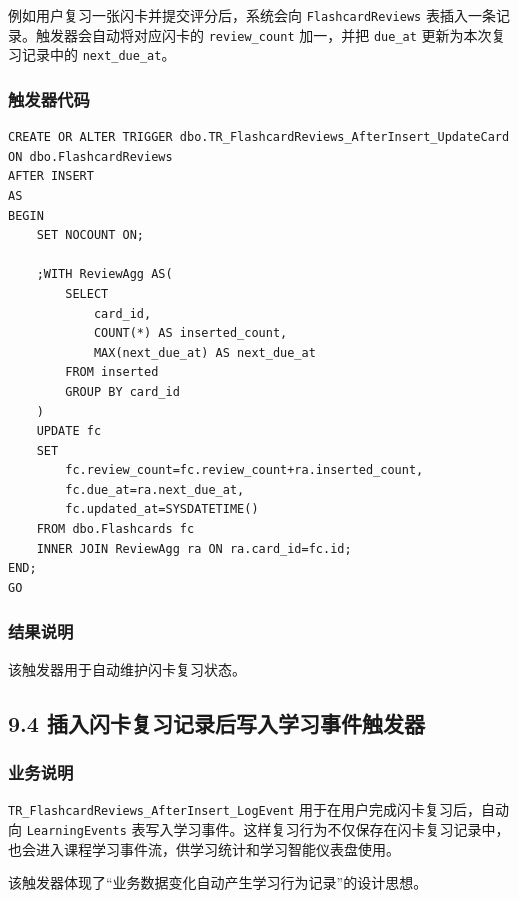 \documentclass[10pt,a4paper,fontset=none]{ctexart}
\begin{document}
例如用户复习一张闪卡并提交评分后，系统会向 \texttt{FlashcardReviews} 表插入一条记录。触发器会自动将对应闪卡的 \texttt{review\_count} 加一，并把 \texttt{due\_at} 更新为本次复习记录中的 \texttt{next\_due\_at}。\par

\subsubsection*{触发器代码}

\begin{Verbatim}[fontsize=\scriptsize,frame=single]
CREATE OR ALTER TRIGGER dbo.TR_FlashcardReviews_AfterInsert_UpdateCard
ON dbo.FlashcardReviews
AFTER INSERT
AS
BEGIN
    SET NOCOUNT ON;

    ;WITH ReviewAgg AS(
        SELECT
            card_id,
            COUNT(*) AS inserted_count,
            MAX(next_due_at) AS next_due_at
        FROM inserted
        GROUP BY card_id
    )
    UPDATE fc
    SET
        fc.review_count=fc.review_count+ra.inserted_count,
        fc.due_at=ra.next_due_at,
        fc.updated_at=SYSDATETIME()
    FROM dbo.Flashcards fc
    INNER JOIN ReviewAgg ra ON ra.card_id=fc.id;
END;
GO
\end{Verbatim}

\subsubsection*{结果说明}

该触发器用于自动维护闪卡复习状态。\par

\subsection*{9.4 插入闪卡复习记录后写入学习事件触发器}

\subsubsection*{业务说明}

\texttt{TR\_FlashcardReviews\_AfterInsert\_LogEvent} 用于在用户完成闪卡复习后，自动向 \texttt{LearningEvents} 表写入学习事件。这样复习行为不仅保存在闪卡复习记录中，也会进入课程学习事件流，供学习统计和学习智能仪表盘使用。\par

该触发器体现了“业务数据变化自动产生学习行为记录”的设计思想。\par
\end{document}

